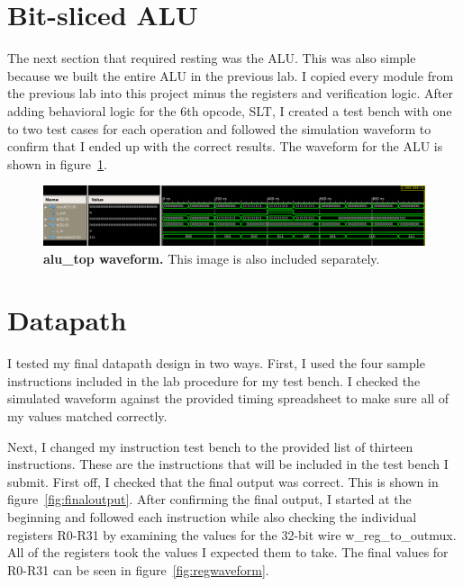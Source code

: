 \documentclass[letterpaper,12pt]{article}
\begin{document}
\section{Bit-sliced ALU}

The next section that required resting was the ALU. This was also simple because we built the entire ALU in the previous lab. I copied every module from the previous lab into this project minus the registers and verification logic. After adding behavioral logic for the 6th opcode, SLT, I created a test bench with one to two test cases for each operation and followed the simulation waveform to confirm that I ended up with the correct results. The waveform for the ALU is shown in figure~\ref{fig:aluwaveform}.

\begin{figure}[h] 
\centering
        \includegraphics[width=1.0\columnwidth]{ALU_waveform}

        \caption{
                \label{fig:aluwaveform}
                {\bf alu\_top waveform.}
               This image is also included separately.
        }
\end{figure}



\section{Datapath}
I tested my final datapath design in two ways. First, I used the four sample instructions included in the lab procedure for my test bench. I checked the simulated waveform against the provided timing spreadsheet to make sure all of my values matched correctly. 

Next, I changed my instruction test bench to the provided list of thirteen instructions. These are the instructions that will be included in the test bench I submit. First off, I checked that the final output was correct. This is shown in figure~\ref{fig:finaloutput}. After confirming the final output, I started at the beginning and followed each instruction while also checking the individual registers R0-R31 by examining the values for the 32-bit wire w\_reg\_to\_outmux. All of the registers took the values I expected them to take. The final values for R0-R31 can be seen in figure~\ref{fig:regwaveform}.
\vspace{10 mm}
\end{document}

